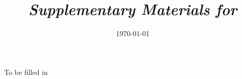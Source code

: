 \documentclass[11pt]{article}
\title{\textit{Supplementary Materials for}\\ \titlepaper}
\author{\authorlist}
\date{\today}
\begin{document}
\maketitle



To be filled in


\end{document}
